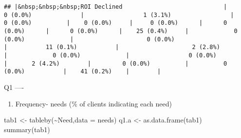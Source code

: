 \documentclass[
]{article}
\newenvironment{Shaded}{\begin{snugshade}}{\end{snugshade}}
\newcommand{\AttributeTok}[1]{\textcolor[rgb]{0.77,0.63,0.00}{#1}}
\newcommand{\FunctionTok}[1]{\textcolor[rgb]{0.00,0.00,0.00}{#1}}
\newcommand{\NormalTok}[1]{#1}
\newcommand{\OtherTok}[1]{\textcolor[rgb]{0.56,0.35,0.01}{#1}}
\newcommand{\SpecialCharTok}[1]{\textcolor[rgb]{0.00,0.00,0.00}{#1}}
\providecommand{\tightlist}{%
  \setlength{\itemsep}{0pt}\setlength{\parskip}{0pt}}
\begin{document}
\begin{verbatim}
## |&nbsp;&nbsp;&nbsp;ROI Declined                             |              0 (0.0%)              |                 1 (3.1%)                 |         0 (0.0%)          |    0 (0.0%)     |     0 (0.0%)      |      0 (0.0%)      |      0 (0.0%)      |    25 (0.4%)     |             0 (0.0%)             |                     0 (0.0%)                     |           11 (0.1%)           |                     2 (2.8%)                      |             0 (0.0%)             |                 0 (0.0%)                  |       2 (4.2%)        |         0 (0.0%)          |          0 (0.0%)           |    41 (0.2%)    |        |
\end{verbatim}

Q1 ----

\begin{enumerate}
\def\labelenumi{\alph{enumi}.}
\tightlist
\item
  Frequency- needs (\% of clients indicating each need)
\end{enumerate}

\begin{Shaded}
\begin{Highlighting}[]
\NormalTok{tab1 }\OtherTok{\textless{}{-}} \FunctionTok{tableby}\NormalTok{(}\SpecialCharTok{\textasciitilde{}}\NormalTok{Need,}\AttributeTok{data =}\NormalTok{ needs)}
\NormalTok{q1.a }\OtherTok{\textless{}{-}} \FunctionTok{as.data.frame}\NormalTok{(tab1)}
\FunctionTok{summary}\NormalTok{(tab1)}
\end{Highlighting}
\end{Shaded}
\end{document}
